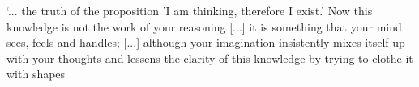 \documentclass[12pt]{extarticle}
\begin{document}
\begin{multicols*}{3}
‘...  the truth of the proposition 'I am thinking, therefore I exist.' 
Now this knowledge is not the work
of your reasoning
[...] it is something that your mind sees,
feels and handles; 
[...] although your imagination insistently mixes itself up with your thoughts
and lessens the clarity of this knowledge by trying to clothe it with shapes
\citep[p.~331 AT V:138]{descartes:1984_vol3}
 

    







\footnotesize


\end{multicols*}
\end{document}
